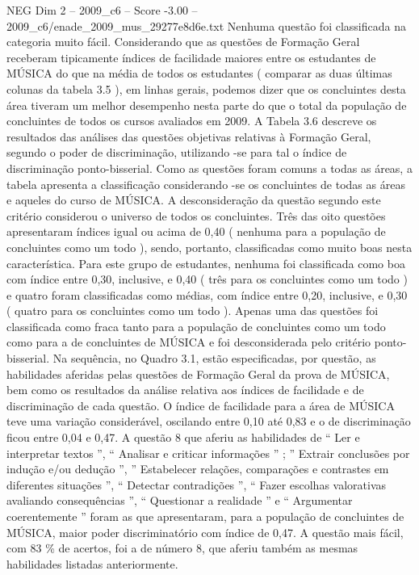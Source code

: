 \begin{textsample}{NEG Dim 2 – 2009\_c6 – Score -3.00 – 2009\_c6/enade\_2009\_mus\_29277e8d6e.txt}
Nenhuma questão foi classificada na categoria muito fácil.
Considerando que as questões de Formação Geral receberam tipicamente índices de facilidade maiores entre os estudantes de MÚSICA do que na média de todos os estudantes ( comparar as duas últimas colunas da tabela 3.5 ), em linhas gerais, podemos dizer que os concluintes desta área tiveram um melhor desempenho nesta parte do que o total da população de concluintes de todos os cursos avaliados em 2009.
A Tabela 3.6 descreve os resultados das análises das questões objetivas relativas à Formação Geral, segundo o poder de discriminação, utilizando -se para tal o índice de discriminação ponto-bisserial.
Como as questões foram comuns a todas as áreas, a tabela apresenta a classificação considerando -se os concluintes de todas as áreas e aqueles do curso de MÚSICA.
A desconsideração da questão segundo este critério considerou o universo de todos os concluintes.
Três das oito questões apresentaram índices igual ou acima de 0,40 ( nenhuma para a população de concluintes como um todo ), sendo, portanto, classificadas como muito boas nesta característica.
Para este grupo de estudantes, nenhuma foi classificada como boa com índice entre 0,30, inclusive, e 0,40 ( três para os concluintes como um todo ) e quatro foram classificadas como médias, com índice entre 0,20, inclusive, e 0,30 ( quatro para os concluintes como um todo ).
Apenas uma das questões foi classificada como fraca tanto para a população de concluintes como um todo como para a de concluintes de MÚSICA e foi desconsiderada pelo critério ponto-bisserial.
Na sequência, no Quadro 3.1, estão especificadas, por questão, as habilidades aferidas pelas questões de Formação Geral da prova de MÚSICA, bem como os resultados da análise relativa aos índices de facilidade e de discriminação de cada questão.
O índice de facilidade para a área de MÚSICA teve uma variação considerável, oscilando entre 0,10 até 0,83 e o de discriminação ficou entre 0,04 e 0,47.
A questão 8 que aferiu as habilidades de “ Ler e interpretar textos ”, “ Analisar e criticar informações ” ; ” Extrair conclusões por indução e/ou dedução ”, ” Estabelecer relações, comparações e contrastes em diferentes situações ”, “ Detectar contradições ”, “ Fazer escolhas valorativas avaliando consequências ”, “ Questionar a realidade ” e “ Argumentar coerentemente ” foram as que apresentaram, para a população de concluintes de MÚSICA, maior poder discriminatório com índice de 0,47.
A questão mais fácil, com 83 \% de acertos, foi a de número 8, que aferiu também as mesmas habilidades listadas anteriormente.

\end{textsample}
